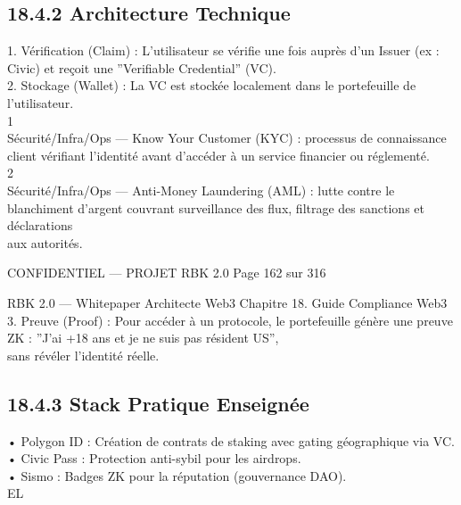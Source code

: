 \documentclass[12pt,landscape,a4paper]{article}
\newenvironment{confidential}
{\begin{tcolorbox}[
    colback=rbkred!5!white,
    colframe=rbkred!75!black,
    title=CONFIDENTIEL,
    fonttitle=\bfseries\color{white},
    coltitle=rbkred!75!black,
    breakable,
    enhanced,
    frame hidden,
    borderline west={2pt}{0pt}{rbkred!75!black}
]}
{\end{tcolorbox}}
\begin{document}
\subsection{18.4.2 Architecture Technique}
1. Vérification (Claim) : L’utilisateur se vérifie une fois auprès d’un Issuer (ex : Civic) et reçoit une ”Verifiable Credential” (VC).\\
\vspace{0.5em}
2. Stockage (Wallet) : La VC est stockée localement dans le portefeuille de l’utilisateur.\\
1\\
Sécurité/Infra/Ops — Know Your Customer (KYC) : processus de connaissance client vérifiant l’identité avant d’accéder à un service financier ou réglementé.\\
2\\
Sécurité/Infra/Ops — Anti-Money Laundering (AML) : lutte contre le blanchiment d’argent couvrant surveillance des flux, filtrage des sanctions et déclarations\\
aux autorités.\\
\vspace{0.5em}
\vspace{0.5em}
\vspace{0.5em}
\begin{confidential}CONFIDENTIEL — PROJET RBK 2.0                                          Page 162 sur 316\end{confidential}
RBK 2.0 — Whitepaper Architecte Web3                                                                Chapitre 18. Guide Compliance Web3\\
\vspace{0.5em}
\vspace{0.5em}
3. Preuve (Proof) : Pour accéder à un protocole, le portefeuille génère une preuve ZK : ”J’ai +18 ans et je ne suis pas résident US”,\\
sans révéler l’identité réelle.\\
\vspace{0.5em}
\vspace{0.5em}
\subsection{18.4.3 Stack Pratique Enseignée}
• Polygon ID : Création de contrats de staking avec gating géographique via VC.\\
\vspace{0.5em}
• Civic Pass : Protection anti-sybil pour les airdrops.\\
\vspace{0.5em}
• Sismo : Badges ZK pour la réputation (gouvernance DAO).\\
\vspace{0.5em}
\vspace{0.5em}
\vspace{0.5em}
\vspace{0.5em}
EL\\
\end{document}
